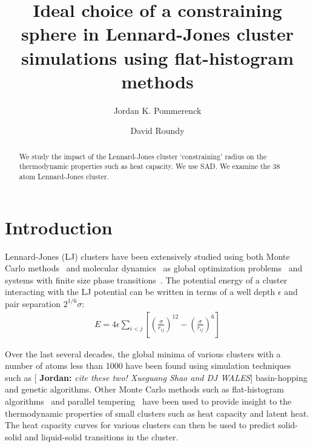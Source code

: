 \documentclass[letterpaper,twocolumn,amsmath,amssymb,pre,aps,10pt]{revtex4-1}
\newcommand{\blue}[1]{{\bf \color{blue} #1}}
\newcommand{\jpsays}[1]{{\color{red} [\blue{Jordan:} \emph{#1}]}}
\begin{document}
\title{Ideal choice of a constraining sphere in Lennard-Jones cluster
simulations using flat-histogram methods
}

\author{Jordan K. Pommerenck} \author{David Roundy}

\begin{abstract}
  We study the impact of the Lennard-Jones cluster `constraining' radius on 
  the thermodynamic properties such as heat capacity. We use SAD. We examine
  the 38 atom Lennard-Jones cluster.
\end{abstract}

\maketitle

\section{Introduction}


Lennard-Jones (LJ) clusters have been extensively studied using both Monte Carlo methods~\cite{frantsuzov2005size, mandelshtam2006structural,
mandelshtam2006multiple} and molecular dynamics~\cite{honeycutt1987molecular, calvo1995configurational, calvo2000phase} as global optimization
problems~\cite{wales1997global, wales1998global, wales1999global, doye1999double} and systems with finite size phase
transitions~\cite{neirotti2000phase, sabo2005pressure, sehgal2014phase}. The potential energy of a cluster interacting with the LJ potential can
be written in terms of a well depth $\epsilon$ and pair separation $2^{1/6}\sigma$:
\begin{align}
E = 4\epsilon \sum_{i<j} \left[ \left( \frac{\sigma}{r_{ij}} \right)^{12} - \left( \frac{\sigma}{r_{ij}} \right)^{6} \right]
\end{align}

Over the last several decades, the global minima of various clusters with a number of atoms less than 1000 have been
found using simulation techniques such as \jpsays{cite these two!  Xueguang Shao and DJ WALES} basin-hopping and genetic algorithms.
Other Monte Carlo methods such as flat-histogram algorithms~\cite{?} and parallel tempering~\cite{?} have been used to provide insight to 
the thermodynamic properties of small clusters such as heat capacity and latent heat. The heat capacity curves for various clusters can
then be used to predict solid-solid and liquid-solid transitions in the cluster. 
\end{document}
